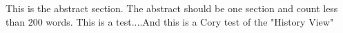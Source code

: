 This is the abstract section. The abstract should be one section and count less than 200 words. This is a test....And this is a Cory test of the "History View"
